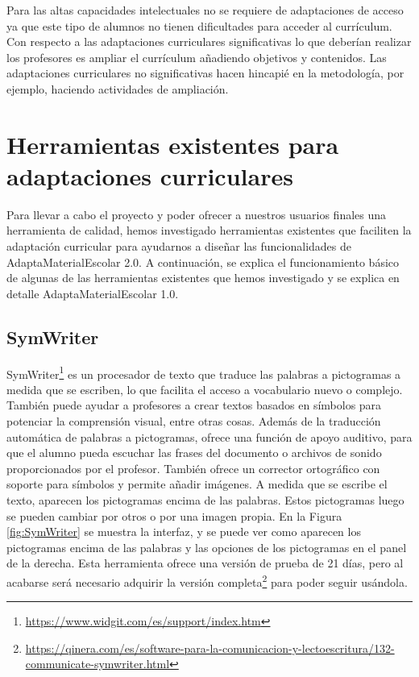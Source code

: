 Para las altas capacidades intelectuales no se requiere de adaptaciones de acceso ya que  este tipo de alumnos no tienen dificultades para acceder al currículum. Con respecto a las adaptaciones curriculares significativas lo que deberían realizar los profesores es ampliar el currículum añadiendo objetivos y contenidos. Las adaptaciones curriculares no significativas hacen hincapié en la metodología, por ejemplo, haciendo actividades de ampliación.



\section{Herramientas existentes para adaptaciones curriculares}
\label{cap:herramientas}
Para llevar a cabo el proyecto y poder ofrecer a nuestros usuarios finales una herramienta de calidad, hemos investigado herramientas existentes que faciliten la adaptación curricular para ayudarnos a diseñar las funcionalidades de AdaptaMaterialEscolar 2.0. A continuación, se explica el funcionamiento básico de algunas de las herramientas existentes que hemos investigado y se explica en detalle AdaptaMaterialEscolar 1.0.

\subsection{SymWriter}
SymWriter\footnote{\url{https://www.widgit.com/es/support/index.htm}} es un procesador de texto que traduce las palabras a pictogramas a medida que se escriben, lo que facilita el acceso a vocabulario nuevo o complejo. También puede ayudar a profesores a crear textos basados en símbolos para potenciar la comprensión visual, entre otras cosas. Además de la traducción automática de palabras a pictogramas, ofrece una función de apoyo auditivo, para que el alumno pueda escuchar las frases del documento o archivos de sonido proporcionados por el profesor. También ofrece un corrector ortográfico con soporte para símbolos y permite añadir imágenes. A medida que se escribe el texto, aparecen los pictogramas encima de las palabras. Estos pictogramas luego se pueden cambiar por otros o por una imagen propia. En la Figura \ref{fig:SymWriter} se muestra la interfaz, y se puede ver como aparecen los pictogramas encima de las palabras y las opciones de los pictogramas en el panel de la derecha. Esta herramienta ofrece una versión de prueba de 21 días, pero al acabarse será necesario adquirir la versión completa\footnote{\url{https://qinera.com/es/software-para-la-comunicacion-y-lectoescritura/132-communicate-symwriter.html}} para poder seguir usándola.

